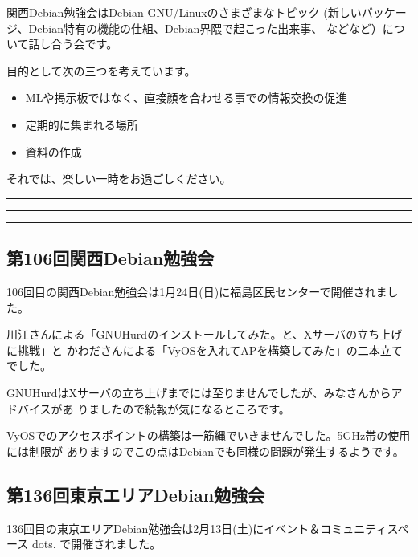 \documentclass[mingoth,a4paper]{jsarticle}
\begin{document}
 関西Debian勉強会はDebian GNU/Linuxのさまざまなトピック
 (新しいパッケージ、Debian特有の機能の仕組、Debian界隈で起こった出来事、
 などなど）について話し合う会です。

 目的として次の三つを考えています。
 \begin{itemize}
  \item MLや掲示板ではなく、直接顔を合わせる事での情報交換の促進
  \item 定期的に集まれる場所
  \item 資料の作成
 \end{itemize}

 それでは、楽しい一時をお過ごしください。

\newpage

\begin{minipage}[b]{0.2\hsize}
 {}
\end{minipage}
\begin{minipage}[b]{0.8\hsize}
\hrule
\vspace{2mm}
\hrule
\setcounter{tocdepth}{1}
\tableofcontents
\vspace{2mm}
\hrule
\end{minipage}


\subsection{第106回関西Debian勉強会}

106回目の関西Debian勉強会は1月24日(日)に福島区民センターで開催されました。

川江さんによる「GNUHurdのインストールしてみた。と、Xサーバの立ち上げに挑戦」と
かわださんによる「VyOSを入れてAPを構築してみた」の二本立てでした。

GNUHurdはXサーバの立ち上げまでには至りませんでしたが、みなさんからアドバイスがあ
りましたので続報が気になるところです。

VyOSでのアクセスポイントの構築は一筋縄でいきませんでした。5GHz帯の使用には制限が
ありますのでこの点はDebianでも同様の問題が発生するようです。

\subsection{第136回東京エリアDebian勉強会}

136回目の東京エリアDebian勉強会は2月13日(土)にイベント＆コミュニティスペース dots.
で開催されました。
\end{document}
